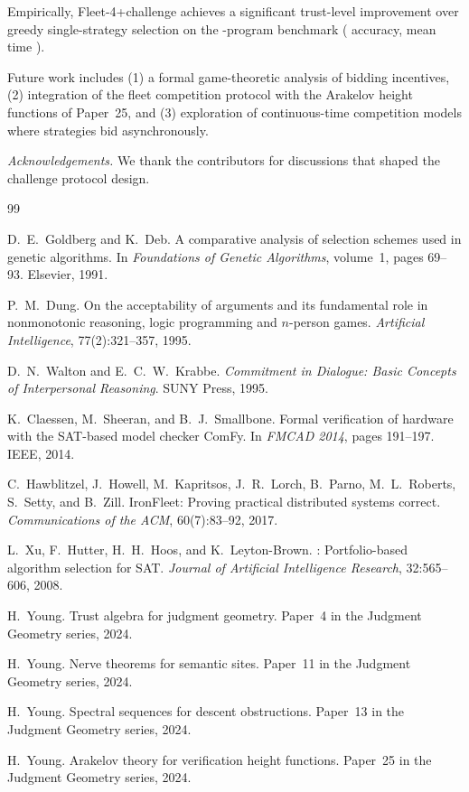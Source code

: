 \documentclass[11pt]{article}
\begin{document}
Empirically, Fleet-4+challenge achieves a significant trust-level improvement over
greedy single-strategy selection on the \expTotalPrograms-program benchmark
(\expAccuracy{} accuracy, mean time \expTimeMean).

Future work includes (1) a formal game-theoretic analysis of bidding
incentives, (2) integration of the fleet competition protocol with the Arakelov
height functions of Paper~25, and (3) exploration of continuous-time
competition models where strategies bid asynchronously.

\bigskip
\noindent\textit{Acknowledgements.}  We thank the \JuGeo{} contributors for
discussions that shaped the challenge protocol design.

\begin{thebibliography}{99}

D.~E.~Goldberg and K.~Deb.
\newblock A comparative analysis of selection schemes used in genetic algorithms.
\newblock In \emph{Foundations of Genetic Algorithms}, volume~1, pages 69--93.
  Elsevier, 1991.

P.~M.~Dung.
\newblock On the acceptability of arguments and its fundamental role in
  nonmonotonic reasoning, logic programming and $n$-person games.
\newblock \emph{Artificial Intelligence}, 77(2):321--357, 1995.

D.~N.~Walton and E.~C.~W.~Krabbe.
\newblock \emph{Commitment in Dialogue: Basic Concepts of Interpersonal
  Reasoning}.
\newblock SUNY Press, 1995.

K.~Claessen, M.~Sheeran, and B.~J.~Smallbone.
\newblock Formal verification of hardware with the SAT-based model checker
  ComFy.
\newblock In \emph{FMCAD 2014}, pages 191--197. IEEE, 2014.

C.~Hawblitzel, J.~Howell, M.~Kapritsos, J.~R.~Lorch, B.~Parno, M.~L.~Roberts,
  S.~Setty, and B.~Zill.
\newblock IronFleet: Proving practical distributed systems correct.
\newblock \emph{Communications of the ACM}, 60(7):83--92, 2017.

L.~Xu, F.~Hutter, H.~H.~Hoos, and K.~Leyton-Brown.
: Portfolio-based algorithm selection for {SAT}.
\newblock \emph{Journal of Artificial Intelligence Research}, 32:565--606, 2008.

H.~Young.
\newblock Trust algebra for judgment geometry.
\newblock Paper~4 in the Judgment Geometry series, 2024.

H.~Young.
\newblock Nerve theorems for semantic sites.
\newblock Paper~11 in the Judgment Geometry series, 2024.

H.~Young.
\newblock Spectral sequences for descent obstructions.
\newblock Paper~13 in the Judgment Geometry series, 2024.

H.~Young.
\newblock Arakelov theory for verification height functions.
\newblock Paper~25 in the Judgment Geometry series, 2024.

\end{thebibliography}
\end{document}
